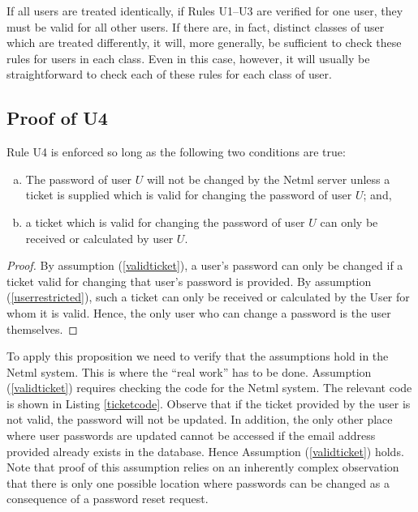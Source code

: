 If all users are treated identically, if Rules U1--U3 are verified for one user, they
must be valid for all other users. If there are, in fact, distinct classes of user which 
are treated differently, it will, more generally, be sufficient to check these rules for 
users in each class. Even in this case, however, it will usually be straightforward to check
each of these rules for each class of user.

\subsection{Proof of U4}
\begin{proposition}
Rule U4 is enforced so long as the following two conditions are true:
\begin{enumerate}[(a)]
\item\label{validticket} The password of  user $U$ will not be changed by the Netml server
unless a ticket is supplied which is valid for changing the password of
user $U$; and,

\item\label{userrestricted} a ticket which is valid for changing the password of user $U$
can only be received or calculated by user $U$.

\end{enumerate}
\end{proposition}

\begin{proof} 
By assumption (\ref{validticket}), a user's password can only be changed
if a ticket valid for changing that user's password is provided. By assumption (\ref{userrestricted}),
such a ticket can only be received or calculated by the User for whom it is valid. Hence, the only
user who can change a password is the user themselves.
\end{proof}

To apply this proposition we need to verify that the assumptions hold in the Netml system.
This is where the ``real work'' has to be done. Assumption (\ref{validticket}) requires
checking the code for the Netml system. The relevant code is shown in Listing \ref{ticketcode}.
Observe that if the ticket provided by the user is not valid, the password will not be updated.
In addition, the only other place where user passwords are updated cannot be accessed
if the email address provided already exists in the database. Hence Assumption (\ref{validticket})
holds. Note that proof of this assumption relies on an inherently complex observation that
there is only one possible location where passwords can be changed as a consequence of a 
password reset request.

